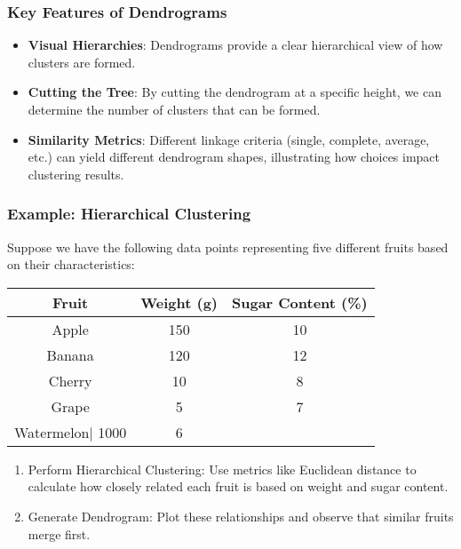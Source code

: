 \documentclass[aspectratio=169]{beamer}
\begin{document}
\begin{frame}[fragile]
    \frametitle{Key Features of Dendrograms}
    \begin{itemize}
        \item \textbf{Visual Hierarchies}: Dendrograms provide a clear hierarchical view of how clusters are formed.
        \item \textbf{Cutting the Tree}: By cutting the dendrogram at a specific height, we can determine the number of clusters that can be formed.
        \item \textbf{Similarity Metrics}: Different linkage criteria (single, complete, average, etc.) can yield different dendrogram shapes, illustrating how choices impact clustering results.
    \end{itemize}
\end{frame}

\begin{frame}[fragile]
    \frametitle{Example: Hierarchical Clustering}
    Suppose we have the following data points representing five different fruits based on their characteristics:

    \begin{table}[h]
        \centering
        \begin{tabular}{|c|c|c|}
            \hline
            \textbf{Fruit} & \textbf{Weight (g)} & \textbf{Sugar Content (\%) } \\ \hline
            Apple     & 150        & 10                 \\ \hline
            Banana    & 120        & 12                 \\ \hline
            Cherry    & 10         & 8                  \\ \hline
            Grape     & 5          & 7                  \\ \hline
            Watermelon| 1000       & 6                  \\ \hline
        \end{tabular}
    \end{table}

    \begin{enumerate}
        \item Perform Hierarchical Clustering: Use metrics like Euclidean distance to calculate how closely related each fruit is based on weight and sugar content.
        \item Generate Dendrogram: Plot these relationships and observe that similar fruits merge first.
    \end{enumerate}
\end{frame}
\end{document}
